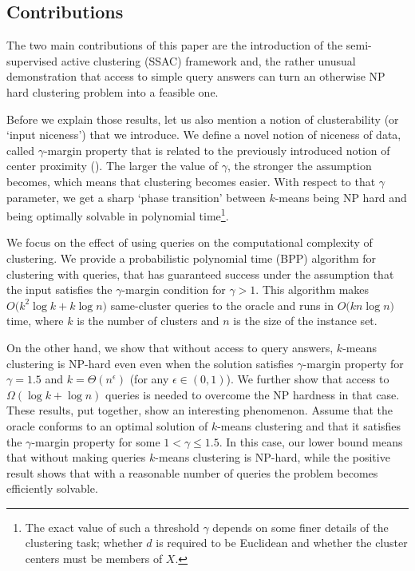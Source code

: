 \documentclass{article}
\begin{document}
\subsection{Contributions}
The two main contributions of this paper are the introduction of the semi-supervised active clustering (SSAC) framework and, the rather unusual 
demonstration that access to simple query answers can turn an otherwise NP hard clustering problem into a feasible one. 

Before we explain those results, let us also mention a notion of clusterability (or `input niceness') that we introduce. We define a novel notion of niceness of data, called $\gamma$-margin property that is related to the previously introduced notion of center proximity (\cite{awasthi2012center}). The larger the value of $\gamma$, the stronger the assumption becomes, which means that clustering becomes easier. With respect to that $\gamma$ parameter, we get a sharp `phase transition' between $k$-means being NP hard and being optimally solvable in polynomial time\footnote{The exact value of such a threshold $\gamma$ depends on some finer details of the clustering task; whether $d$ is required to be Euclidean and whether the cluster centers must be members of $X$.}.

We focus on the effect of using queries on the computational complexity of clustering. We provide a probabilistic polynomial time (BPP) algorithm for clustering with queries, that has guaranteed success under the assumption that the input satisfies the $\gamma$-margin condition for $\gamma > 1$. This algorithm makes $O\big(k^2\log k + k\log n)$ same-cluster queries to the oracle and runs in $O\big(kn\log n)$ time, where $k$ is the number of clusters and $n$ is the size of the instance set.

On the other hand, we show that without access to query answers, $k$-means clustering is NP-hard even even when the solution satisfies $\gamma$-margin property for $\gamma= 1.5$ and $k=\Theta(n^\epsilon)$ (for any $\epsilon\in (0,1)$). We further show that access to $\Omega(\log k + \log n)$ queries is needed to overcome the NP hardness in that case.
These results, put together, show an interesting phenomenon. Assume that the oracle conforms to an optimal solution of $k$-means clustering and that it satisfies the $\gamma$-margin property for some $1<\gamma \leq 1.5$. In this case, our lower bound means that without making queries $k$-means clustering is NP-hard, while the positive result shows that with a reasonable number of queries the problem becomes efficiently solvable.  
\end{document}
